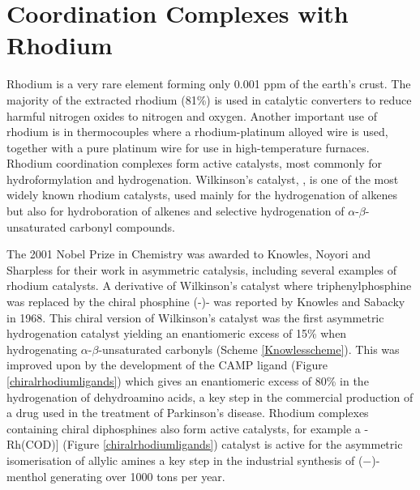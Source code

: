 
\chapter{Coordination Complexes with Rhodium}
\label{ch:rhodium}

Rhodium is a very rare element forming only 0.001 ppm of the earth's crust.\cite{Enghag2004Rhabundance}  The majority of the extracted rhodium (81\%) is used in catalytic converters to reduce harmful nitrogen oxides to nitrogen and oxygen.  Another important use of rhodium is in thermocouples where a rhodium-platinum alloyed wire is used, together with a pure platinum wire for use in high-temperature furnaces.\cite{Enghag2004Rh}  Rhodium coordination complexes form active catalysts, most commonly for hydroformylation and hydrogenation.  Wilkinson's catalyst, , is one of the most widely known rhodium catalysts, used mainly for the hydrogenation of alkenes but also for hydroboration of alkenes and selective hydrogenation of $\alpha$-$\beta$-unsaturated carbonyl compounds.  

The 2001 Nobel Prize in Chemistry was awarded to Knowles,\cite{Knowles2002} Noyori\cite{Noyori2002} and Sharpless\cite{Sharpless2002} for their work in asymmetric catalysis, including several examples of rhodium catalysts.  A derivative of Wilkinson's catalyst where triphenylphosphine was replaced by the chiral phosphine (-)- was reported by Knowles and Sabacky in 1968\cite{Knowles1968}.  This chiral version of Wilkinson's catalyst was the first asymmetric hydrogenation catalyst yielding an enantiomeric excess of 15\% when hydrogenating $\alpha$-$\beta$-unsaturated carbonyls (Scheme \ref{Knowlesscheme}).  This was improved upon by the development of the CAMP ligand (Figure \ref{chiralrhodiumligands}) which gives an enantiomeric excess of 80\% in the hydrogenation of dehydroamino acids, a key step in the commercial production of   a drug used in the treatment of Parkinson's disease.\cite{Noyori2007}  Rhodium complexes containing chiral diphosphines also form active catalysts, for example a \iupac{[\cip{S}-BINAP}-Rh(COD)] (Figure \ref{chiralrhodiumligands}) catalyst is active for the asymmetric isomerisation of allylic amines a key step in the industrial synthesis of ($-$)-menthol generating over 1000 tons per year.\cite{Noyori2002}

